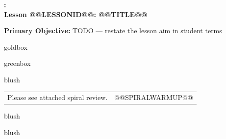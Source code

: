 \documentclass[10pt]{article}
\makeatletter
\newcommand{\LessonNumberName}{Lesson @@LESSONID@@: @@TITLE@@}
\makeatother
\begin{document}
\begin{center}
    {\Large\bfseries \CourseName: \SchoolYear \\
    {\small\bfseries \UnitNumberName \LessonNumberName}}
\end{center}

\begin{tcolorbox}[colback=blush, colframe=burgundy, boxrule=0.9pt, arc=2mm,
    left=2mm, right=2mm, top=1.5mm, bottom=1.5mm]
    \textbf{Primary Objective:} TODO --- restate the lesson aim in student terms
\end{tcolorbox}

\renewcommand{\arraystretch}{1.6}
\begin{skillbox}{goldbox}
\end{skillbox}

\begin{skillbox}{greenbox}
\end{skillbox}

\begin{fixedskillbox}{blush}
    \begin{tabularx}{\linewidth}{@{}X c@{}}
        \begin{minipage}[t]{0.55\linewidth}\vspace{0pt}
            Please see attached spiral review.  %
        \end{minipage}
        &
        \begin{minipage}[t]{0.38\linewidth}\vspace{0pt}\centering
@@SPIRALWARMUP@@
        \end{minipage}
    \end{tabularx}
\end{fixedskillbox}

\begin{skillbox}[Hook]{blush}
\end{skillbox}

\begin{skillbox}[Lesson]{blush}
\end{skillbox}
\end{document}
